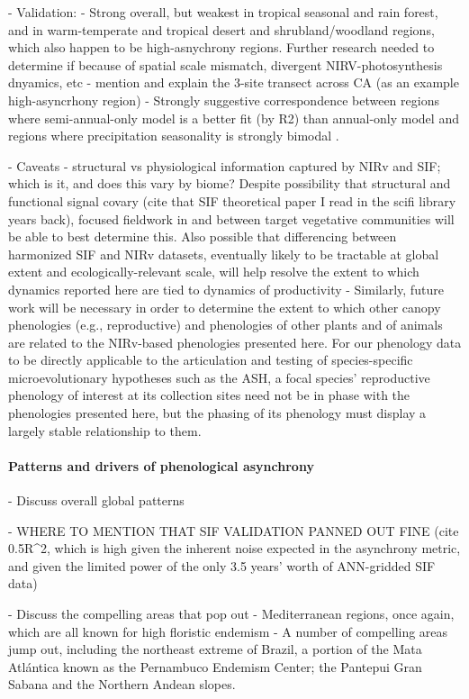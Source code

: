 \documentclass[12pt]{article}
\begin{document}
- Validation:
  - Strong overall, but weakest in tropical seasonal and rain forest, and in warm-temperate and tropical desert and shrubland/woodland regions, which also happen to be high-asnychrony regions. Further research needed to determine if because of spatial scale mismatch, divergent NIRV-photosynthesis dnyamics, etc
  - mention and explain the 3-site transect across CA (as an example high-asyncrhony region)
  - Strongly suggestive correspondence between regions where semi-annual-only model is a better fit (by R2) than annual-only model and regions where precipitation seasonality is strongly bimodal \cite{knoben}.

- Caveats
  - structural vs physiological information captured by NIRv and SIF; which is it, and does this vary by biome? Despite possibility that structural and functional signal covary (cite that SIF theoretical paper I read in the scifi library years back), focused fieldwork in and between target vegetative communities will be able to best determine this. Also possible that differencing between harmonized SIF and NIRv datasets, eventually likely to be tractable at global extent and ecologically-relevant scale, will help resolve the extent to which dynamics reported here are tied to dynamics of productivity
  - Similarly, future work will be necessary in order to determine the extent to which other canopy phenologies (e.g., reproductive) and phenologies of other plants and of animals are related to the NIRv-based phenologies presented here. For our phenology data to be directly applicable to the articulation and testing of species-specific microevolutionary hypotheses such as the ASH, a focal species' reproductive phenology of interest at its collection sites need not be in phase with the phenologies presented here, but the phasing of its phenology must display a largely stable relationship to them.


\paragraph*{Patterns and drivers of phenological asynchrony}

- Discuss overall global patterns

- WHERE TO MENTION THAT SIF VALIDATION PANNED OUT FINE (cite 0.5R^2, which is high given the inherent noise expected in the asynchrony metric, and given the limited power of the only 3.5 years' worth of ANN-gridded SIF data)

- Discuss the compelling areas that pop out
  - Mediterranean regions, once again, which are all known for high floristic endemism
  - A number of compelling areas jump out, including the northeast extreme of Brazil, a portion of the Mata Atlántica known as the Pernambuco Endemism Center; the Pantepui Gran Sabana and the Northern Andean slopes.
 
\end{document}
